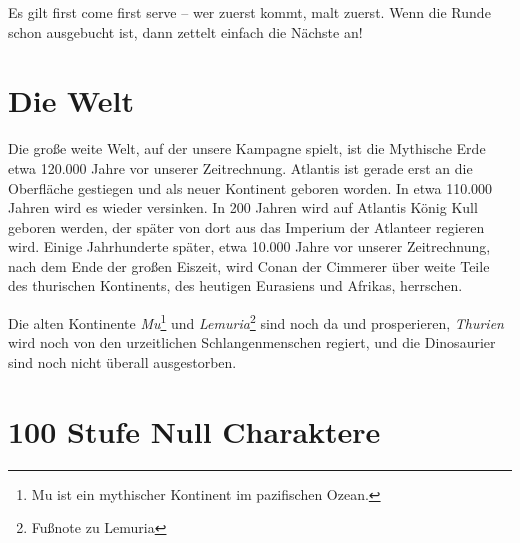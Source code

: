 \documentclass[11pt]{wbzine}
\begin{document}
\begin{multicols}{2}
Es gilt first come first serve – wer zuerst kommt, malt zuerst. Wenn die Runde
schon ausgebucht ist, dann zettelt einfach die Nächste an!



\section{Die Welt}

Die große weite Welt, auf der unsere Kampagne spielt, ist die Mythische Erde
etwa 120.000 Jahre vor unserer Zeitrechnung. Atlantis ist gerade erst an die
Oberfläche gestiegen und als neuer Kontinent geboren worden. In etwa 110.000
Jahren wird es wieder versinken.  In 200 Jahren wird auf Atlantis König Kull
geboren werden, der später von dort aus das Imperium der Atlanteer regieren
wird.  Einige Jahrhunderte später, etwa 10.000 Jahre vor unserer Zeitrechnung,
nach dem Ende der großen Eiszeit, wird Conan der Cimmerer über weite Teile des
thurischen Kontinents, des heutigen Eurasiens und Afrikas, herrschen.

Die alten Kontinente \textit{Mu}\footnote{Mu ist ein mythischer Kontinent im
pazifischen Ozean.} und \textit{Lemuria}\footnote{Fußnote zu Lemuria} sind noch
da und prosperieren, \textit{Thurien} wird noch von den urzeitlichen
Schlangenmenschen regiert, und die Dinosaurier sind noch nicht überall
ausgestorben.


\end{multicols}

\section{100 Stufe Null Charaktere}
\label{100char}
\end{document}
